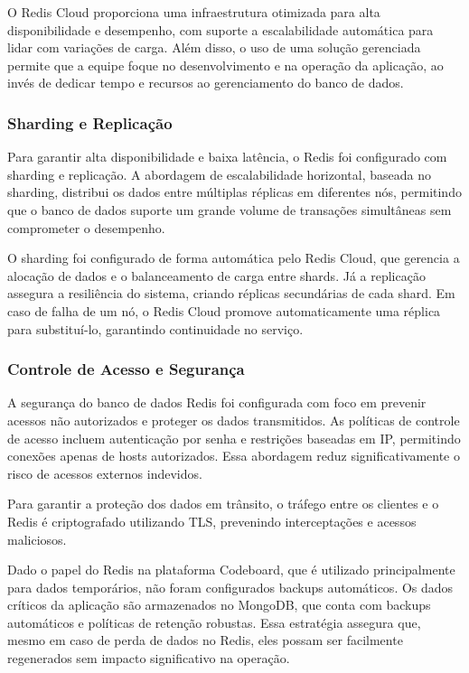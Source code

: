 O Redis Cloud proporciona uma infraestrutura otimizada para alta disponibilidade e desempenho, com suporte a escalabilidade automática para lidar com variações de carga. Além disso, o uso de uma solução gerenciada permite que a equipe foque no desenvolvimento e na operação da aplicação, ao invés de dedicar tempo e recursos ao gerenciamento do banco de dados.

\subsubsection{Sharding e Replicação}

Para garantir alta disponibilidade e baixa latência, o Redis foi configurado com sharding e replicação. A abordagem de escalabilidade horizontal, baseada no sharding, distribui os dados entre múltiplas réplicas em diferentes nós, permitindo que o banco de dados suporte um grande volume de transações simultâneas sem comprometer o desempenho.

O sharding foi configurado de forma automática pelo Redis Cloud, que gerencia a alocação de dados e o balanceamento de carga entre shards. Já a replicação assegura a resiliência do sistema, criando réplicas secundárias de cada shard. Em caso de falha de um nó, o Redis Cloud promove automaticamente uma réplica para substituí-lo, garantindo continuidade no serviço.

\subsubsection{Controle de Acesso e Segurança}

A segurança do banco de dados Redis foi configurada com foco em prevenir acessos não autorizados e proteger os dados transmitidos. As políticas de controle de acesso incluem autenticação por senha e restrições baseadas em IP, permitindo conexões apenas de hosts autorizados. Essa abordagem reduz significativamente o risco de acessos externos indevidos.

Para garantir a proteção dos dados em trânsito, o tráfego entre os clientes e o Redis é criptografado utilizando TLS, prevenindo interceptações e acessos maliciosos.

Dado o papel do Redis na plataforma Codeboard, que é utilizado principalmente para dados temporários, não foram configurados backups automáticos. Os dados críticos da aplicação são armazenados no MongoDB, que conta com backups automáticos e políticas de retenção robustas. Essa estratégia assegura que, mesmo em caso de perda de dados no Redis, eles possam ser facilmente regenerados sem impacto significativo na operação.



